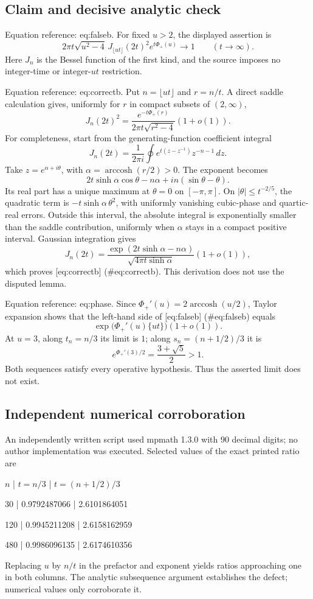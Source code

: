 \documentclass[10pt]{article}
\begin{document}
\subsection*{Claim and decisive analytic check}
Equation reference: eq:falseb. For fixed \(u>2\), the displayed assertion is \[
 2\pi t\sqrt{u^2-4}\,J_{\lfloor ut\rfloor}(2t)^2e^{t\Phi_+(u)}
 \longrightarrow1\qquad(t\longrightarrow\infty).\] Here \(J_n\) is the Bessel function of the first kind, and the source imposes no integer-time or integer-\(ut\) restriction.\par
Equation reference: eq:correctb. Put \(n=\lfloor ut\rfloor\) and \(r=n/t\). A direct saddle calculation gives, uniformly for \(r\) in compact subsets of \((2,\infty)\), \[
 J_n(2t)^2=
 \frac{e^{-t\Phi_+(r)}}{2\pi t\sqrt{r^2-4}}(1+o(1)).\] For completeness, start from the generating-function coefficient integral \[J_n(2t)=\frac{1}{2\pi i}\oint e^{t(z-z^{-1})}z^{-n-1}\,dz.\] Take \(z=e^{\alpha+i\theta}\), with \(\alpha=\mathop{\mathrm{arccosh}}(r/2)>0\). The exponent becomes \[2t\sinh\alpha\cos\theta-n\alpha
       +in(\sin\theta-\theta).\] Its real part has a unique maximum at \(\theta=0\) on \([-\pi,\pi]\). On \(|\theta|\le t^{-2/5}\), the quadratic term is \(-t\sinh\alpha\,\theta^2\), with uniformly vanishing cubic-phase and quartic-real errors. Outside this interval, the absolute integral is exponentially smaller than the saddle contribution, uniformly when \(\alpha\) stays in a compact positive interval. Gaussian integration gives \[J_n(2t)=
 \frac{\exp(2t\sinh\alpha-n\alpha)}
      {\sqrt{4\pi t\sinh\alpha}}(1+o(1)),\] which proves [eq:correctb] (\#eq:correctb). This derivation does not use the disputed lemma.\par
Equation reference: eq:phase. Since \(\Phi_+'(u)=2\mathop{\mathrm{arccosh}}(u/2)\), Taylor expansion shows that the left-hand side of [eq:falseb] (\#eq:falseb) equals \[
 \exp\!\big(\Phi_+'(u)\{ut\}\big)(1+o(1)).\] At \(u=3\), along \(t_n=n/3\) its limit is \(1\); along \(s_n=(n+1/2)/3\) it is \[e^{\Phi_+'(3)/2}=\frac{3+\sqrt5}{2}>1.\] Both sequences satisfy every operative hypothesis. Thus the asserted limit does not exist.\par
\subsection*{Independent numerical corroboration}
An independently written script used mpmath 1.3.0 with 90 decimal digits; no author implementation was executed. Selected values of the exact printed ratio are\par
\(n\) | \(t=n/3\) | \(t=(n+1/2)/3\)\par
30 | 0.9792487066 | 2.6101864051\par
120 | 0.9945211208 | 2.6158162959\par
480 | 0.9986096135 | 2.6174610356\par
Replacing \(u\) by \(n/t\) in the prefactor and exponent yields ratios approaching one in both columns. The analytic subsequence argument establishes the defect; numerical values only corroborate it.\par
\end{document}
